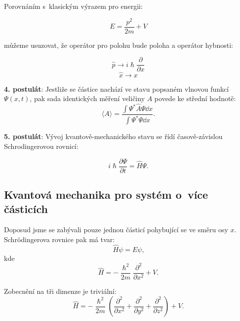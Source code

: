 \noindent Porovnáním s~klasickým výrazem pro energii:

\begin{equation}
E = \frac{p^2}{2m} + V
\label{rov:Postulaty2}
\end{equation}

\noindent můžeme usuzovat, že operátor pro polohu bude poloha a operátor hybnosti:

\begin{equation}
\hat{p} \rightarrow  i\hslash \frac{\partial}{\partial x}
\label{rov:Postulaty3}
\end{equation}
\begin{equation}
\hat{x} \rightarrow   x
\label{rov:Postulaty4}
\end{equation}

{\bf 4. postulát}: Jestliže se částice nachází ve stavu popsaném vlnovou funkcí $\Psi(x,t)$, pak sada identických měření veličiny $A$ povede ke střední hodnotě:
\begin{equation}
\langle A \rangle = \frac{\int \Psi^*\hat{A}\Psi \dd x}{\int \Psi^*\Psi \dd x}\mbox{.}
\label{rov:Postulaty5}
\end{equation}

{\bf 5. postulát}: Vývoj kvantově-mechanického stavu se řídí časově-závislou Schrodingerovou rovnicí:

\begin{equation}
i\hslash\frac{\partial \Psi}{\partial t} = \hat{H}\Psi \mbox{.}
\label{rov:Postulaty6}
\end{equation}

\subsection{Kvantová mechanika pro systém o~více částicích}

Doposud jsme se zabývali pouze jednou částicí pohybující se ve směru osy $x$. Schr\"odingerova rovnice pak má tvar:
\begin{equation}
\hat{H}\psi = E\psi \mbox{,}
\label{rov:Vicecastic1}
\end{equation}
kde
\begin{equation}
\hat{H} = -\frac{\hslash^2}{2m}\frac{\partial^2}{\partial x^2} + V{.}
\label{rov:Vicecastic2}
\end{equation}

\noindent Zobecnění na tři dimenze je triviální:
\begin{equation}
\hat{H} = -\frac{\hslash^2}{2m}\left( \frac{\partial^2}{\partial x^2} + \frac{\partial^2}{\partial y^2} + \frac{\partial^2}{\partial z^2} \right ) + V \mbox{.}
\label{rov:Vicecastic3}
\end{equation}

